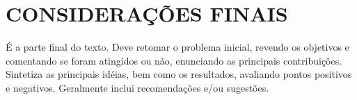 \documentclass[../main.tex]{subfiles}
\begin{document}
\chapter*[Conclusão]{CONSIDERAÇÕES FINAIS}
É a parte final do texto. Deve retomar o problema inicial, revendo os objetivos
e comentando se foram atingidos ou não, enunciando as principais contribuições.
Sintetiza as principais idéias, bem como os resultados, avaliando pontos positivos e
negativos. Geralmente inclui recomendações e/ou sugestões. 
\end{document}
